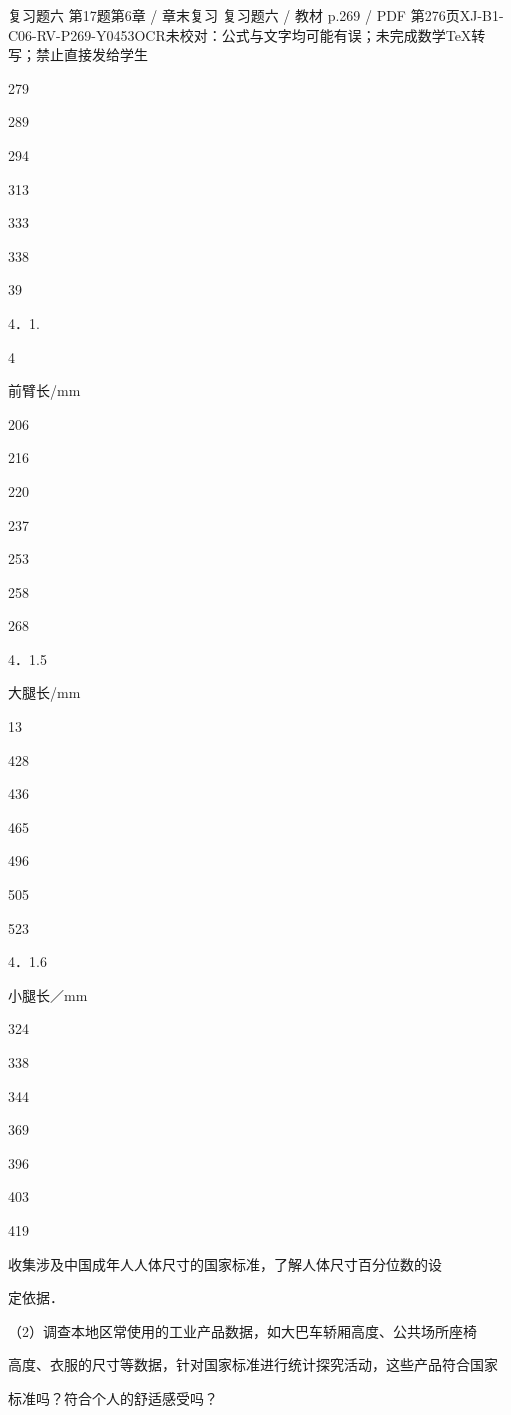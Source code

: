 \begin{bankitem}{复习题六 第17题}{第6章 / 章末复习 复习题六 / 教材 p.269 / PDF 第276页}{XJ-B1-C06-RV-P269-Y0453}{OCR未校对：公式与文字均可能有误；未完成数学TeX转写；禁止直接发给学生}
\begin{ocrdraft}
279
\par
289
\par
294
\par
313
\par
333
\par
338
\par
39
\par
4．1.
\par
4
\par
前臂长/mm
\par
206
\par
216
\par
220
\par
237
\par
253
\par
258
\par
268
\par
4．1.5
\par
大腿长/mm
\par
13
\par
428
\par
436
\par
465
\par
496
\par
505
\par
523
\par
4．1.6
\par
小腿长／mm
\par
324
\par
338
\par
344
\par
369
\par
396
\par
403
\par
419
\par
收集涉及中国成年人人体尺寸的国家标准，了解人体尺寸百分位数的设
\par
定依据．
\par
（2）调查本地区常使用的工业产品数据，如大巴车轿厢高度、公共场所座椅
\par
高度、衣服的尺寸等数据，针对国家标准进行统计探究活动，这些产品符合国家
\par
标准吗？符合个人的舒适感受吗？
\end{ocrdraft}
\end{bankitem}
